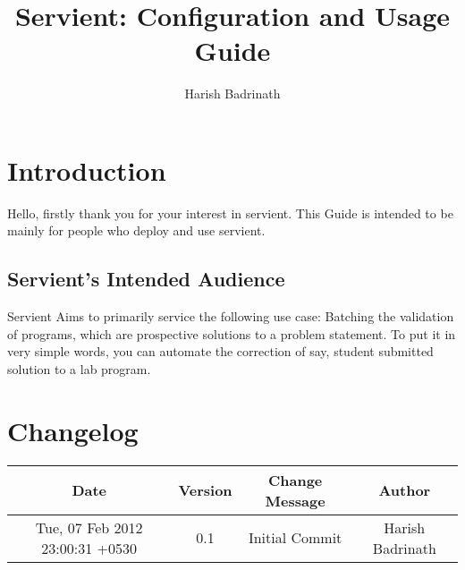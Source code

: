 \documentclass{book}
\title{Servient: Configuration and Usage Guide}
\author{Harish Badrinath}
\begin{document}
  \maketitle
  \tableofcontents{}
  \chapter{Introduction}
    Hello, firstly thank you for your interest in servient. This Guide is intended to be mainly for people who deploy and use servient.
    \section{Servient's Intended Audience} 
    Servient Aims to primarily service the following use case: Batching the validation of programs, which are prospective solutions to a problem statement.
    To put it in very simple words, you can automate the correction of say, student submitted solution to a lab program.
  \chapter{Changelog}
    \begin{tabular}{ | c | c | c | c | }
      \hline
      Date & Version & Change Message & Author\\ \hline
      Tue, 07 Feb 2012 23:00:31 +0530 & 0.1 & Initial Commit & Harish Badrinath\\ \hline
    \end{tabular}
\end{document}
